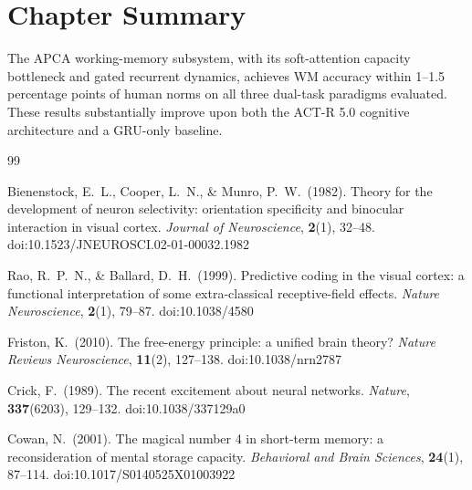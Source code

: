 \documentclass[12pt, a4paper, oneside]{report}
\theoremstyle{definition}
\theoremstyle{remark}
\providecommand{\doi}[1]{doi:#1}
\begin{document}
\section{Chapter Summary}

The APCA working-memory subsystem, with its soft-attention capacity bottleneck and
gated recurrent dynamics, achieves WM accuracy within 1--1.5 percentage points of human
norms on all three dual-task paradigms evaluated.  These results substantially improve
upon both the ACT-R 5.0 cognitive architecture and a GRU-only baseline.

\begin{thebibliography}{99}

Bienenstock, E.~L., Cooper, L.~N., \& Munro, P.~W.\ (1982).
Theory for the development of neuron selectivity: orientation specificity and binocular
interaction in visual cortex.
\textit{Journal of Neuroscience}, \textbf{2}(1), 32--48.
\doi{10.1523/JNEUROSCI.02-01-00032.1982}

Rao, R.~P.~N., \& Ballard, D.~H.\ (1999).
Predictive coding in the visual cortex: a functional interpretation of some extra-classical
receptive-field effects.
\textit{Nature Neuroscience}, \textbf{2}(1), 79--87.
\doi{10.1038/4580}

Friston, K.\ (2010).
The free-energy principle: a unified brain theory?
\textit{Nature Reviews Neuroscience}, \textbf{11}(2), 127--138.
\doi{10.1038/nrn2787}

Crick, F.\ (1989).
The recent excitement about neural networks.
\textit{Nature}, \textbf{337}(6203), 129--132.
\doi{10.1038/337129a0}

Cowan, N.\ (2001).
The magical number 4 in short-term memory: a reconsideration of mental storage capacity.
\textit{Behavioral and Brain Sciences}, \textbf{24}(1), 87--114.
\doi{10.1017/S0140525X01003922}

\end{thebibliography}
\end{document}

